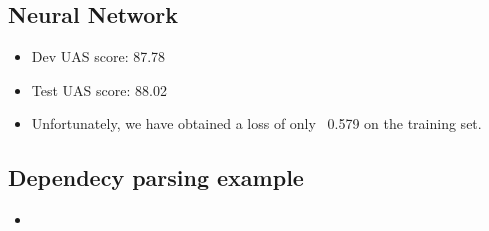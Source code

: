 \documentclass[a4paper]{article}
\begin{document}
\subsection{Neural Network}
\begin{itemize}
    \item Dev UAS score: 87.78
    \item Test UAS score: 88.02
    \item Unfortunately, we have obtained a loss of only ~0.579 on the training set.
\end{itemize}
\subsection{Dependecy parsing example}
\begin{itemize}
    \item 
\end{itemize}
\end{document}
